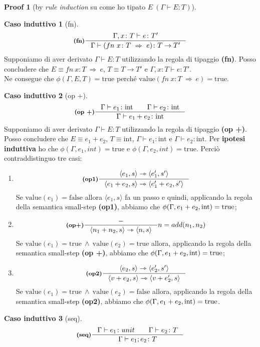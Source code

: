 \documentclass[a4paper, 10pt]{article}
\newcommand{\integer}{\textup{int}}
\theoremstyle{definition}
\newtheorem{prf}{Proof}[]
\newtheorem{ind}{Caso induttivo}
\newcommand{\infer}[4]{\inference[\textbf{#1}]{#2}{#3}#4 }
\newcommand{\srule}[2]{\langle #1 \rangle \rightarrowtriangle \langle #2 \rangle}
\begin{document}
\begin{multicols}{2}
\begin{prf}[by \textit{rule induction} su come ho tipato $ E\ (\Gamma \vdash E\colon T) $]
	\begin{ind}[fn]
		\[
			\infer{(fn)}{\Gamma , x \colon T \vdash e\colon T'}{\Gamma\vdash (fn\ x\colon T\ \Rightarrow\ e )\colon T\rightarrow T'}{}
		\]
		Supponiamo di aver derivato $ \Gamma \vdash E\colon T $ utilizzando la regola di tipaggio \textbf{(fn)}. Posso concludere che $ E\equiv fn\ x\colon T\ \Rightarrow\ e $, $ T\equiv T\rightarrow T' $ e $ \Gamma , x \colon T \vdash e\colon T' $.\\ Ne consegue che $ \phi (\Gamma, E, T) = \text{true} $ perché $ \text{value}(fn\ x\colon T\ \Rightarrow\ e) = \text{true} $.
	\end{ind}
	\begin{ind}[op +]
		\[
			\infer{(op +)}{\Gamma \vdash e_1\colon \integer\qquad \Gamma \vdash e_2\colon \integer}{\Gamma\vdash e_1 + e_2 \colon \integer}{}
		\]
		Supponiamo di aver derivato $ \Gamma \vdash E\colon T $ utilizzando la regola di tipaggio \textbf{(op +)}. Posso concludere che $ E\equiv e_1 + e_2 $, $ T\equiv \text{int} $, $ \Gamma\vdash e_1 \colon \text{int} $ e $ \Gamma\vdash e_2 \colon \text{int} $. Per \textbf{ipotesi induttiva} ho che $ \phi(\Gamma, e_1, int)= \text{true} $ e $ \phi(\Gamma, e_2, int)= \text{true} $. Perciò contraddistinguo tre casi:
		\begin{enumerate}
			\item 
			\[
				\infer{(op1)}{\srule{e_1,s}{e_1', s'}}{\srule{e_1 + e_2,s}{e_1' + e_2,s'}}{}
			\]
			Se $ \text{value}(e_1) = \text{false} $ allora $ \langle e_1, s \rangle $ fa un passo e quindi, applicando la regola della semantica small-step \textbf{(op1)}, abbiamo che $ \phi(\Gamma, e_1 + e_2, \text{int}) = \textup{true} $;
			\item
			\[
				\infer{(op+)}{-}{\srule{n_1 + n_2,s}{n,s}}{n=add(n_1,n_2)}
			\]
			Se $ \text{value}(e_1) = \text{true}\ \wedge\ \text{value}(e_2) = \text{true} $ allora, applicando la regola della semantica small-step \textbf{(op +)}, abbiamo che $ \phi(\Gamma, e_1 + e_2, \text{int}) = \textup{true} $;
			\item 
			\[
				\infer{(op2)}{\srule{e_2,s}{e_2', s'}}{\srule{v + e_2,s}{v + e_2',s}}{}
			\]
			Se $ \text{value}(e_1) = \text{true}\ \wedge\ \text{value}(e_2) = \text{false} $ allora, applicando la regola della semantica small-step \textbf{(op2)}, abbiamo che $ \phi(\Gamma, e_1 + e_2, \text{int}) = \textup{true} $.
		\end{enumerate}
	\end{ind}
	\begin{ind}[seq]
		\[
			\infer{(seq)}{\Gamma \vdash e_1\colon unit \qquad \Gamma\vdash e_2\colon T}{\Gamma \vdash e_1;e_2\colon T}{}
\]
\end{ind}
\end{prf}
\end{multicols}
\end{document}
